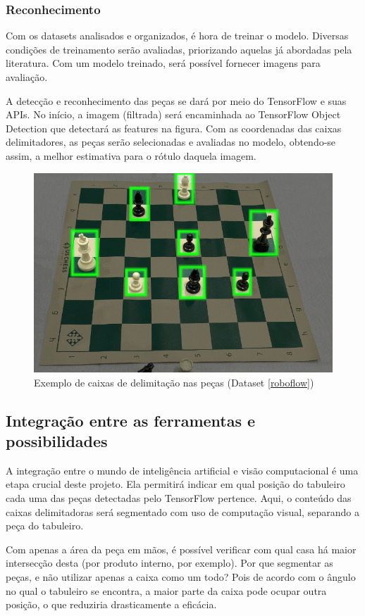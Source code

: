 \documentclass[a4paper,12pt,twoside]{article}
\begin{document}
\subsubsection{Reconhecimento}

Com os datasets analisados e organizados, é hora de treinar o modelo.
Diversas condições de treinamento serão avaliadas, priorizando aquelas já abordadas pela literatura.
Com um modelo treinado, será possível fornecer imagens para avaliação.

A detecção e reconhecimento das peças se dará por meio do TensorFlow e suas APIs.
No início, a imagem (filtrada) será encaminhada ao TensorFlow Object Detection que detectará as features na figura.
Com as coordenadas das caixas delimitadores,
as peças serão selecionadas e avaliadas no modelo, obtendo-se assim, a melhor estimativa para o rótulo daquela imagem.

\begin{figure}[h!]
\centering
  \includegraphics[width=0.7\linewidth]{fig/delimitar.jpg}
  \caption{Exemplo de caixas de delimitação nas peças (Dataset \ref{roboflow})}
\label{fig:delimitar}
\end{figure}

\subsection{Integração entre as ferramentas e possibilidades}

A integração entre o mundo de inteligência artificial e visão computacional é uma etapa crucial deste projeto.
Ela permitirá indicar em qual posição do tabuleiro cada uma das peças detectadas pelo TensorFlow pertence.
Aqui, o conteúdo das caixas delimitadoras será segmentado com uso de computação visual, separando a peça do tabuleiro.

Com apenas a área da peça em mãos,
é possível verificar com qual casa há maior intersecção desta (por produto interno, por exemplo).
Por que segmentar as peças, e não utilizar apenas a caixa como um todo?
Pois de acordo com o ângulo no qual o tabuleiro se encontra,
a maior parte da caixa pode ocupar outra posição, o que reduziria drasticamente a eficácia.
\end{document}
